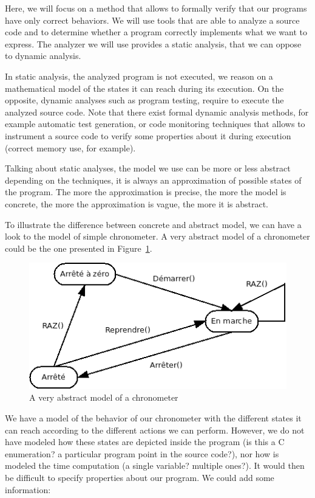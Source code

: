 \documentclass[12pt,francais,]{scrbook}
\begin{document}
Here, we will focus on a method that allows to formally verify that our
programs have only correct behaviors. We will use tools that are able to
analyze a source code and to determine whether a program correctly
implements what we want to express. The analyzer we will use provides a
static analysis, that we can oppose to dynamic analysis.

In static analysis, the analyzed program is not executed, we reason on a
mathematical model of the states it can reach during its execution. On
the opposite, dynamic analyses such as program testing, require to
execute the analyzed source code. Note that there exist formal dynamic
analysis methods, for example automatic test generation, or code
monitoring techniques that allows to instrument a source code to verify
some properties about it during execution (correct memory use, for
example).

Talking about static analyses, the model we use can be more or less
abstract depending on the techniques, it is always an approximation of
possible states of the program. The more the approximation is precise,
the more the model is concrete, the more the approximation is vague, the
more it is abstract.

To illustrate the difference between concrete and abstract model, we can
have a look to the model of simple chronometer. A very abstract model of
a chronometer could be the one presented in Figure~\ref{fig:1-1-chrono}.

\begin{figure}[htbp]
\centering
\includegraphics[scale=0.5]{1-1-model.png}
\caption{A very abstract model of a chronometer}
\label{fig:1-1-chrono}
\end{figure}

We have a model of the behavior of our chronometer with the different
states it can reach according to the different actions we can perform.
However, we do not have modeled how these states are depicted inside the
program (is this a C enumeration? a particular program point in the
source code?), nor how is modeled the time computation (a single
variable? multiple ones?). It would then be difficult to specify
properties about our program. We could add some information:
\end{document}
